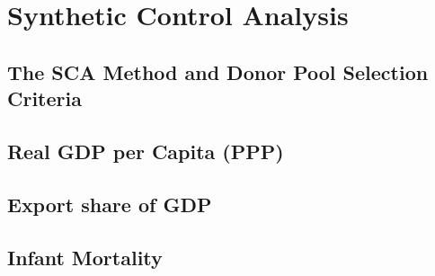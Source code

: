 \documentclass[12pt]{article}
\begin{document}
\section{Synthetic Control Analysis}

\subsection{The SCA Method and Donor Pool Selection Criteria}

\subsection{Real GDP per Capita (PPP)}

\subsection{Export share of GDP}

\subsection{Infant Mortality}





\newpage
\singlespacing
\printbibliography

\end{document}
